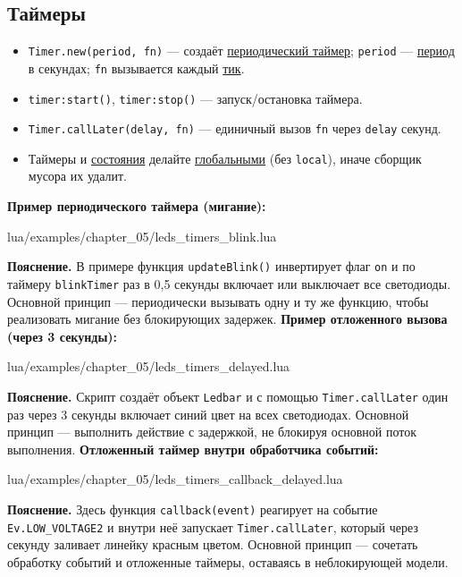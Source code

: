 \subsection{Таймеры}
\begin{itemize}
  \item \verb|Timer.new(period, fn)| — создаёт \hyperlink{term:timer}{периодический таймер}; \verb|period| — \hyperlink{term:period}{период} в секундах; \verb|fn| вызывается каждый \hyperlink{term:tick}{тик}.
  \item \verb|timer:start()|, \verb|timer:stop()| — запуск/остановка таймера.
  \item \verb|Timer.callLater(delay, fn)| — единичный вызов \verb|fn| через \verb|delay| секунд.
  \item Таймеры и \hyperlink{term:state}{состояния} делайте \hyperlink{term:scope}{глобальными} (без \verb|local|), иначе сборщик мусора их удалит.
\end{itemize}
\textbf{Пример периодического таймера (мигание):}
\begin{codefile}{lua/examples/chapter_05/leds_timers_blink.lua}
\end{codefile}
\textbf{Пояснение.} В примере функция \verb|updateBlink()| инвертирует флаг \verb|on| и по таймеру \verb|blinkTimer| раз в 0{,}5 секунды включает или выключает все светодиоды. Основной принцип — периодически вызывать одну и ту же функцию, чтобы реализовать мигание без блокирующих задержек.
\textbf{Пример отложенного вызова (через 3 секунды):}
\begin{codefile}{lua/examples/chapter_05/leds_timers_delayed.lua}
\end{codefile}
\textbf{Пояснение.} Скрипт создаёт объект \verb|Ledbar| и с помощью \verb|Timer.callLater| один раз через 3 секунды включает синий цвет на всех светодиодах. Основной принцип — выполнить действие с задержкой, не блокируя основной поток выполнения.
\textbf{Отложенный таймер внутри обработчика событий:}
\begin{codefile}{lua/examples/chapter_05/leds_timers_callback_delayed.lua}
\end{codefile}
\textbf{Пояснение.} Здесь функция \verb|callback(event)| реагирует на событие \verb|Ev.LOW_VOLTAGE2| и внутри неё запускает \verb|Timer.callLater|, который через секунду заливает линейку красным цветом. Основной принцип — сочетать обработку событий и отложенные таймеры, оставаясь в неблокирующей модели.
